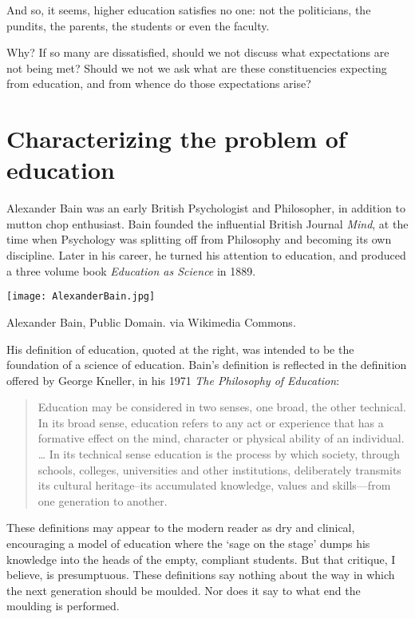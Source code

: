 And so, it seems, higher education satisfies no one: not the politicians, the pundits, the parents, the students or even the faculty. 

Why? If so many are dissatisfied, should we not discuss what expectations are not being met? Should we not we ask what are these constituencies expecting from education, and from whence do those expectations arise?

\section{Characterizing the problem of education}
\label{characterizingtheproblemofeducation}

 Alexander Bain was an early British Psychologist and Philosopher, in addition to mutton chop enthusiast. Bain founded the influential British Journal \emph{Mind}, at the time when Psychology was splitting off from Philosophy and becoming its own discipline. Later in his career, he turned his attention to education, and produced a three volume book \emph{Education as Science} in 1889.\begin{marginfigure}\texttt{[image: AlexanderBain.jpg]}\caption{Alexander Bain, Public Domain. via Wikimedia Commons.}\label{fig:socrates}\end{marginfigure}

His definition of education, quoted at the right, was intended to be the foundation of a science of education. Bain's definition is reflected in the definition offered by George Kneller, in his 1971 \emph{The Philosophy of Education}:

\begin{quote}

Education may be considered in two senses, one broad, the other technical. In its broad sense, education refers to any act or experience that has a formative effect on the mind, character or physical ability of an individual. {\ldots} In its technical sense education is the process by which society, through schools, colleges, universities and other institutions, deliberately transmits its cultural heritage--its accumulated knowledge, values and skills---from one generation to another. ~\citep[P. 20--21]{Kneller:1971wq}
\end{quote}

These definitions may appear to the modern reader as dry and clinical, encouraging a model of education where the `sage on the stage' dumps his knowledge into the heads of the empty, compliant students. But that critique, I believe, is presumptuous. These definitions say nothing about the way in which the next generation should be moulded. Nor does it say to what end the moulding is performed.

